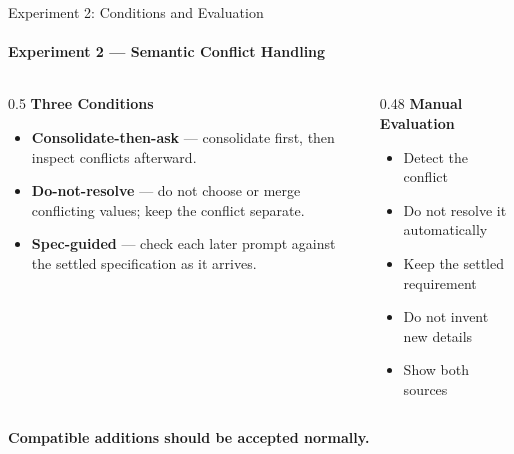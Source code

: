 \documentclass[aspectratio=169,11pt,c]{beamer}
\newcommand{\takeaway}[1]{\begin{center}{\bfseries\color{accentorange}\large #1}\end{center}}
\begin{document}
\begin{frame}{Experiment 2: Conditions and Evaluation}
  \framesubtitle{Experiment 2 --- Semantic Conflict Handling}
  \begin{columns}[T]
    \begin{column}{0.5\textwidth}
      {\small\bfseries\color{primaryblue}Three Conditions}
      \begin{itemize}\scriptsize
        \item \textbf{Consolidate-then-ask} --- consolidate first, then inspect conflicts afterward.
        \item \textbf{Do-not-resolve} --- do not choose or merge conflicting values; keep the conflict separate.
        \item \textbf{Spec-guided} --- check each later prompt against the settled specification as it arrives.
      \end{itemize}
    \end{column}
    \begin{column}{0.48\textwidth}
      {\small\bfseries\color{primaryblue}Manual Evaluation}
      \begin{itemize}\scriptsize
        \item Detect the conflict
        \item Do not resolve it automatically
        \item Keep the settled requirement
        \item Do not invent new details
        \item Show both sources
      \end{itemize}
    \end{column}
  \end{columns}
  \vspace{6pt}
  \takeaway{Compatible additions should be accepted normally.}
\end{frame}
\end{document}
